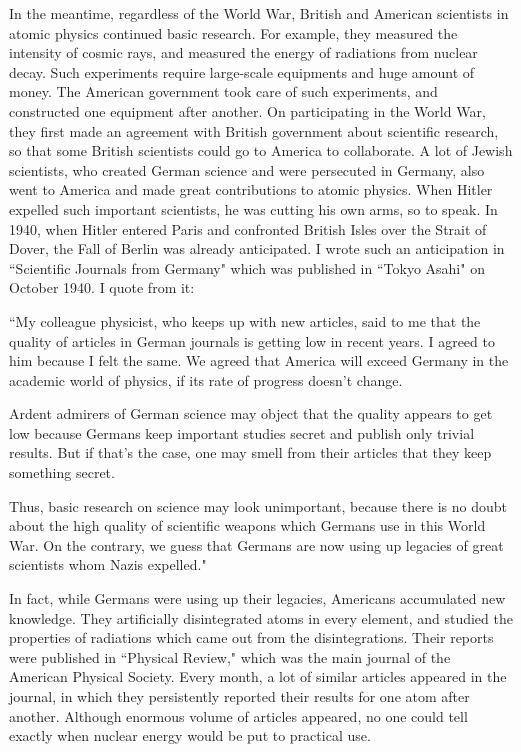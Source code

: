 \documentclass[11pt,a4j,twocolumn]{jarticle}
\begin{document}
In the meantime, regardless of the World War, 
British and American scientists in atomic physics continued basic research.
For example, they measured the intensity of cosmic rays,
and measured the energy of radiations from nuclear decay.
Such experiments require large-scale equipments and huge amount of money.
The American government took care of such experiments, 
and constructed one equipment after another.
On participating in the World War, they first made an agreement with British government
about scientific research, so that some British scientists could go to America to collaborate.
A lot of Jewish scientists, who created German science and were persecuted in Germany,
also went to America and made great contributions to atomic physics.
When Hitler expelled such important scientists, he was cutting his own arms, so to speak.
In 1940, when Hitler entered Paris and confronted British Isles over the Strait of Dover,
the Fall of Berlin was already anticipated.
I wrote such an anticipation in ``Scientific Journals from Germany" which was 
published in ``Tokyo Asahi" on October 1940. I quote from it:

\vspace{7.3pt}\noindent
``My colleague physicist, who keeps up with new articles, said to me that
the quality of articles in German journals is getting low in recent years.
I agreed to him because I felt the same.
We agreed that America will exceed Germany in the academic world of physics,
if its rate of progress doesn't change.

Ardent admirers of German science may object that
the quality appears to get low because Germans keep important studies secret
and publish only trivial results. But if that's the case, one may smell
from their articles that they keep something secret.

Thus, basic research on science may look unimportant,
because there is no doubt about the high quality of
scientific weapons which Germans use in this World War.
On the contrary, we guess that Germans are now using up
legacies of great scientists whom Nazis expelled."

\vspace{7.3pt}
In fact, while Germans were using up their legacies,
Americans accumulated new knowledge.
They artificially disintegrated atoms in every element,
and studied the properties of radiations which came out from the disintegrations.
Their reports were published in ``Physical Review," which was
the main journal of the American Physical Society.
Every month, a lot of similar articles appeared in the journal,
in which they persistently reported their results for one atom after another.
Although enormous volume of articles appeared,
no one could tell exactly when nuclear energy would be put to practical use.
\end{document}
